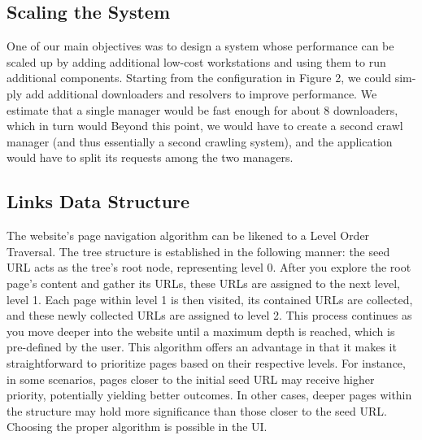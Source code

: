 \subsection{Scaling the System}
One of our main objectives was to design a system whose
performance can be scaled up by adding additional low-cost
workstations and using them to run additional components.
Starting from the configuration in Figure 2, we could sim-
ply add additional downloaders and resolvers to improve
performance. We estimate that a single manager would be
fast enough for about 8 downloaders, which in turn would Beyond this point,
we would have to create a second crawl manager (and thus
essentially a second crawling system), and the application
would have to split its requests among the two managers.
\cite{shkapenyuk2002design}
\subsection{Links Data Structure}
The website's page navigation algorithm can be likened to a Level Order Traversal. The tree structure is established in the following manner: the seed URL acts as the tree's root node, representing level 0. After you explore the root page's content and gather its URLs, these URLs are assigned to the next level, level 1. Each page within level 1 is then visited, its contained URLs are collected, and these newly collected URLs are assigned to level 2. This process continues as you move deeper into the website until a maximum depth is reached, which is pre-defined by the user.
This algorithm offers an advantage in that it makes it straightforward to prioritize pages based on their respective levels. For instance, in some scenarios, pages closer to the initial seed URL may receive higher priority, potentially yielding better outcomes. In other cases, deeper pages within the structure may hold more significance than those closer to the seed URL. Choosing the proper algorithm is possible in the UI.

